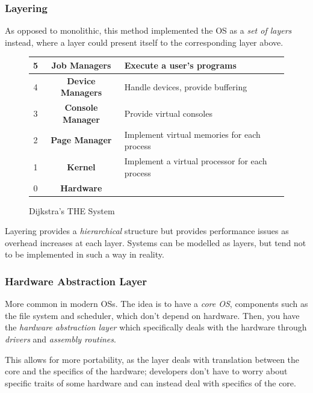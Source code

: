 \documentclass[a4]{article}
\begin{document}
\subsubsection{Layering}

As opposed to monolithic, this method implemented the OS as a \textit{set of layers} instead, where a layer could present itself to the corresponding layer above.

\begin{figure}[H]
  \centering
  \begin{center}
    \begin{tabular}{|c|c|l|}
      \hline
      5 & \textbf{Job Managers} & Execute a user's programs\\
      \hline
      4 & \textbf{Device Managers} & Handle devices, provide buffering\\
      \hline
      3 & \textbf{Console Manager} & Provide virtual consoles\\
      \hline
      2 & \textbf{Page Manager} & Implement virtual memories for each process\\
      \hline
      1 & \textbf{Kernel} & Implement a virtual processor for each process\\
      \hline
      0 & \textbf{Hardware} & \\
      \hline
    \end{tabular}
  \end{center}
  \caption{Dijkstra's THE System}
\end{figure}

Layering provides a \textit{hierarchical} structure but provides performance issues as overhead increases at each layer. Systems can be modelled as layers, but tend not to be implemented in such a way in reality.

\subsubsection{Hardware Abstraction Layer}

More common in modern OSs. The idea is to have a \textit{core OS}, components such as the file system and scheduler, which don't depend on hardware. Then, you have the \textit{hardware abstraction layer} which specifically deals with the hardware through \textit{drivers} and \textit{assembly routines}.

This allows for more portability, as the layer deals with translation between the core and the specifics of the hardware; developers don't have to worry about specific traits of some hardware and can instead deal with specifics of the core.
\end{document}
